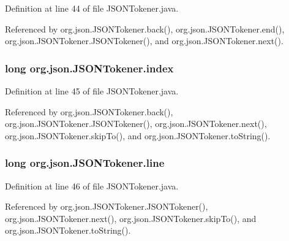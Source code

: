 Definition at line 44 of file J\-S\-O\-N\-Tokener.\-java.



Referenced by org.\-json.\-J\-S\-O\-N\-Tokener.\-back(), org.\-json.\-J\-S\-O\-N\-Tokener.\-end(), org.\-json.\-J\-S\-O\-N\-Tokener.\-J\-S\-O\-N\-Tokener(), and org.\-json.\-J\-S\-O\-N\-Tokener.\-next().

\hypertarget{classorg_1_1json_1_1_j_s_o_n_tokener_aee137d262ad66a4cf877626a5549a69b}{
\subsubsection[{index}]{\setlength{\rightskip}{0pt plus 5cm}long org.\-json.\-J\-S\-O\-N\-Tokener.\-index\hspace{0.3cm}{\ttfamily [private]}}}\label{classorg_1_1json_1_1_j_s_o_n_tokener_aee137d262ad66a4cf877626a5549a69b}


Definition at line 45 of file J\-S\-O\-N\-Tokener.\-java.



Referenced by org.\-json.\-J\-S\-O\-N\-Tokener.\-back(), org.\-json.\-J\-S\-O\-N\-Tokener.\-J\-S\-O\-N\-Tokener(), org.\-json.\-J\-S\-O\-N\-Tokener.\-next(), org.\-json.\-J\-S\-O\-N\-Tokener.\-skip\-To(), and org.\-json.\-J\-S\-O\-N\-Tokener.\-to\-String().

\hypertarget{classorg_1_1json_1_1_j_s_o_n_tokener_ad906cc46c2380d59b17549770823fb60}{
\subsubsection[{line}]{\setlength{\rightskip}{0pt plus 5cm}long org.\-json.\-J\-S\-O\-N\-Tokener.\-line\hspace{0.3cm}{\ttfamily [private]}}}\label{classorg_1_1json_1_1_j_s_o_n_tokener_ad906cc46c2380d59b17549770823fb60}


Definition at line 46 of file J\-S\-O\-N\-Tokener.\-java.



Referenced by org.\-json.\-J\-S\-O\-N\-Tokener.\-J\-S\-O\-N\-Tokener(), org.\-json.\-J\-S\-O\-N\-Tokener.\-next(), org.\-json.\-J\-S\-O\-N\-Tokener.\-skip\-To(), and org.\-json.\-J\-S\-O\-N\-Tokener.\-to\-String().

